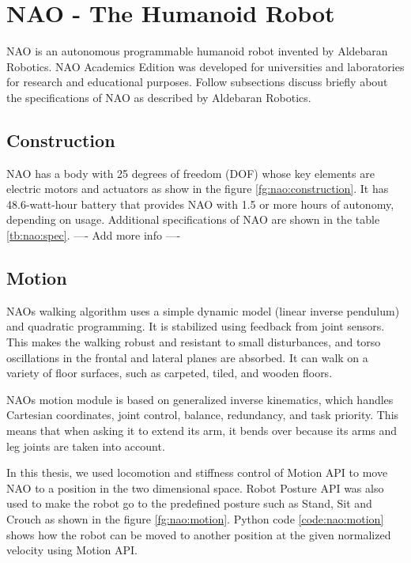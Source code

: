 \section{NAO - The Humanoid Robot} NAO is an autonomous programmable humanoid robot invented by Aldebaran Robotics. NAO Academics Edition was developed for universities and laboratories for research and educational purposes. Follow subsections discuss briefly about the specifications of NAO as described by Aldebaran Robotics.



\subsection{Construction} NAO has a body with 25 degrees of freedom (DOF) whose key elements are electric motors and actuators as show in the figure \ref{fg:nao:construction}. It has 48.6-watt-hour battery that provides NAO with 1.5 or more hours of autonomy, depending on usage. Additional specifications of NAO are shown in the table \ref{tb:nao:spec}. 
---- Add more info ----



\subsection{Motion} NAOs walking algorithm uses a simple dynamic model (linear inverse pendulum) and quadratic programming. It is stabilized using feedback from joint sensors. This makes the walking robust and resistant to small disturbances, and torso oscillations in the frontal and lateral planes are absorbed. It can walk on a variety of floor surfaces, such as carpeted, tiled, and wooden floors. 

NAOs motion module is based on generalized inverse kinematics, which handles Cartesian coordinates, joint control, balance, redundancy, and task priority. This means that when asking it to extend its arm, it bends over because its arms and leg joints are taken into account.



In this thesis, we used locomotion and stiffness control of Motion API to move NAO to a position in the two dimensional space. Robot Posture API was also used to make the robot go to the predefined posture such as Stand, Sit and Crouch as shown in the figure \ref{fg:nao:motion}. Python code \ref{code:nao:motion} shows how the robot can be moved to another position at the given normalized velocity using Motion API. 

